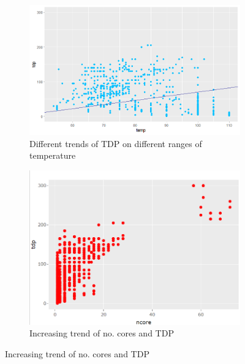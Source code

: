 \begin{figure}[!h]
    \centering
    
    \begin{subfigure}[b]{0.49\textwidth}
        \centering
        \includegraphics[width=\textwidth]{./graphics/scatter_tdp_temp.png}
        \caption{Different trends of TDP on different ranges of temperature}
        \label{fig:tdp_analysis_temp}
    \end{subfigure}
    \begin{subfigure}[b]{0.49\textwidth}
        \centering
        \includegraphics[width=\textwidth]{graphics/new_graphics/Fig5.png}
        \caption{Increasing trend of no. cores and TDP}
        \label{fig:tdp_analysis_ncore}
    \end{subfigure}
\end{figure}







